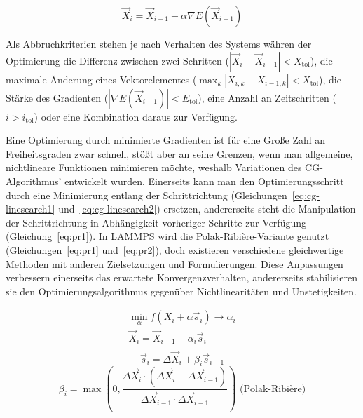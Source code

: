 \begin{equation}
  \vec X_i = \vec X_{i-1} - \alpha \nabla E(\vec X_{i-1})
\end{equation}

Als Abbruchkriterien stehen je nach Verhalten des Systems währen der Optimierung die Differenz zwischen zwei Schritten ($\left|\vec X_i - \vec X_{i-1}\right| < X_\text{tol}$), die maximale Änderung eines Vektorelementes ($\max_k{\left|X_{i,k} - X_{i-1,k}\right|} < X_\text{tol}$), %
die Stärke des Gradienten ($\left|\nabla E(\vec X_{i-1})\right| < E_\text{tol}$), eine Anzahl an Zeitschritten ($i > i_\text{tol}$) oder eine Kombination daraus zur Verfügung.

Eine Optimierung durch minimierte Gradienten ist für eine Große Zahl an Freiheitsgraden zwar schnell, stößt aber an seine Grenzen, wenn man allgemeine, nichtlineare Funktionen minimieren möchte, weshalb Variationen des CG-Algorithmus' entwickelt wurden.
Einerseits kann man den Optimierungsschritt durch eine Minimierung entlang der Schrittrichtung (Gleichungen~\ref{eq:cg-linesearch1} und~\ref{eq:cg-linesearch2}) ersetzen, andererseits steht die Manipulation der Schrittrichtung in Abhängigkeit vorheriger Schritte zur Verfügung (Gleichung~\ref{eq:pr1}).
In LAMMPS wird die Polak-Ribière-Variante genutzt (Gleichungen~\ref{eq:pr1} und~\ref{eq:pr2}), doch existieren verschiedene gleichwertige Methoden mit anderen Zielsetzungen und Formulierungen.
Diese Anpassungen verbessern einerseits das erwartete Konvergenzverhalten, andererseits stabilisieren sie den Optimierungsalgorithmus gegenüber Nichtlinearitäten und Unstetigkeiten.

\begin{gather}
  \label{eq:cg-linesearch1}
  \min_\alpha f(X_i+\alpha \vec s_i) \rightarrow \alpha_i \\
  \label{eq:cg-linesearch2}
  \vec X_i = \vec X_{i-1} - \alpha_i \vec s_i\\
\end{gather}
\begin{equation}
  \label{eq:pr1}
  \vec s_i = \Delta \vec X_i + \beta_i \vec s_{i-1}
\end{equation}
\begin{equation}
  \label{eq:pr2}
  \beta_i = \max \left(0, \frac{\Delta \vec X_i \cdot \left(\Delta \vec X_i - \Delta \vec X_{i-1}\right)}{\Delta \vec X_{i-1} \cdot \Delta \vec X_{i-1}}\right) \text{~(Polak-Ribière)}
\end{equation}

